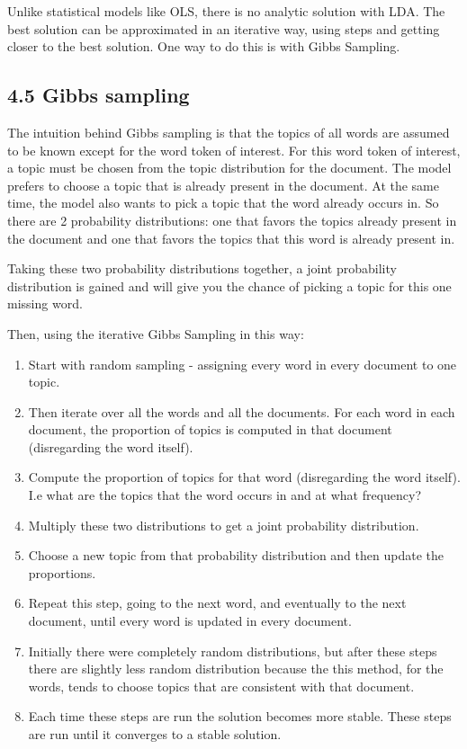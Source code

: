 \documentclass[
]{article}
\providecommand{\tightlist}{%
  \setlength{\itemsep}{0pt}\setlength{\parskip}{0pt}}
\begin{document}
Unlike statistical models like OLS, there is no analytic solution with
LDA. The best solution can be approximated in an iterative way, using
steps and getting closer to the best solution. One way to do this is
with Gibbs Sampling.

\hypertarget{gibbs-sampling}{%
\subsection{4.5 Gibbs sampling}\label{gibbs-sampling}}

The intuition behind Gibbs sampling is that the topics of all words are
assumed to be known except for the word token of interest. For this word
token of interest, a topic must be chosen from the topic distribution
for the document. The model prefers to choose a topic that is already
present in the document. At the same time, the model also wants to pick
a topic that the word already occurs in. So there are 2 probability
distributions: one that favors the topics already present in the
document and one that favors the topics that this word is already
present in.

Taking these two probability distributions together, a joint probability
distribution is gained and will give you the chance of picking a topic
for this one missing word.

Then, using the iterative Gibbs Sampling in this way:

\begin{enumerate}
\def\labelenumi{\arabic{enumi}.}
\tightlist
\item
  Start with random sampling - assigning every word in every document to
  one topic.
\item
  Then iterate over all the words and all the documents. For each word
  in each document, the proportion of topics is computed in that
  document (disregarding the word itself).
\item
  Compute the proportion of topics for that word (disregarding the word
  itself). I.e what are the topics that the word occurs in and at what
  frequency?
\item
  Multiply these two distributions to get a joint probability
  distribution.
\item
  Choose a new topic from that probability distribution and then update
  the proportions.
\item
  Repeat this step, going to the next word, and eventually to the next
  document, until every word is updated in every document.
\item
  Initially there were completely random distributions, but after these
  steps there are slightly less random distribution because the this
  method, for the words, tends to choose topics that are consistent with
  that document.
\item
  Each time these steps are run the solution becomes more stable. These
  steps are run until it converges to a stable solution.
\end{enumerate}
\end{document}
